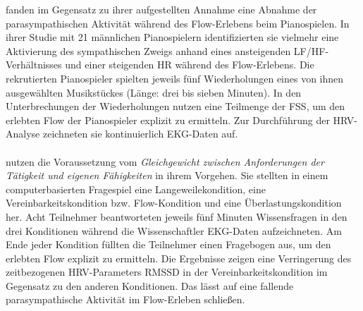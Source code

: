 \label{par:demanzano2010}

\citet{deManzano2010} fanden im Gegensatz zu ihrer aufgestellten Annahme eine Abnahme der parasympathischen Aktivität während des Flow-Erlebens beim Pianospielen. In ihrer Studie mit 21 männlichen Pianospielern identifizierten sie vielmehr eine Aktivierung des sympathischen Zweigs anhand eines ansteigenden \acs{LF}/\acs{HF}-Verhältnisses und einer steigenden HR während des Flow-Erlebens. Die rekrutierten Pianospieler spielten jeweils fünf Wiederholungen eines von ihnen ausgewählten Musikstückes (Länge: drei bis sieben Minuten). In den Unterbrechungen der Wiederholungen nutzen \citet{deManzano2010} eine Teilmenge der \ac{FSS}, um den erlebten Flow der Pianospieler explizit zu ermitteln. Zur Durchführung der \ac{HRV}-Analyse zeichneten sie kontinuierlich \ac{EKG}-Daten auf.

\paragraph{\citet{Keller2011}} 

\label{par:keller2011}

nutzen die Voraussetzung vom \emph{Gleichgewicht zwischen Anforderungen der Tätigkeit und eigenen Fähigkeiten} in ihrem Vorgehen. Sie stellten in einem computerbasierten Fragespiel eine Langeweilekondition, eine Vereinbarkeitskondition bzw. Flow-Kondition und eine Überlastungskondition her. Acht Teilnehmer beantworteten jeweils fünf Minuten Wissensfragen in den drei Konditionen während die Wissenschaftler \ac{EKG}-Daten aufzeichneten. Am Ende jeder Kondition füllten die Teilnehmer einen Fragebogen \citep{Keller2008} aus, um den erlebten Flow explizit zu ermitteln. Die Ergebnisse zeigen eine Verringerung des zeitbezogenen \ac{HRV}-Parameters \acs{RMSSD} in der Vereinbarkeitskondition im Gegensatz zu den anderen Konditionen. Das lässt auf eine fallende parasympathische Aktivität im Flow-Erleben schließen.

\paragraph{\citet{Gaggioli2013}} 

\label{par:gaggioli2013}

